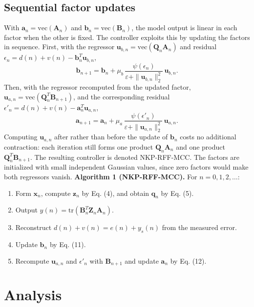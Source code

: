 \documentclass[preprint,12pt]{elsarticle}
\begin{document}
\subsection{Sequential factor updates}
With $\mathbf{a}_n = \mathrm{vec}(\mathbf{A}_n)$ and $\mathbf{b}_n = \mathrm{vec}(\mathbf{B}_n)$, the model output is linear in each factor when the other is fixed. The controller exploits this by updating the factors in sequence. First, with the regressor $\mathbf{u}_{b,n} = \mathrm{vec}(\mathbf{Q}_n \mathbf{A}_n)$ and residual $\epsilon_n = d(n) + v(n) - \mathbf{b}_n^T \mathbf{u}_{b,n}$,
\begin{equation}
\mathbf{b}_{n+1} = \mathbf{b}_n + \mu_b\, \frac{\psi(\epsilon_n)}{\varepsilon + \|\mathbf{u}_{b,n}\|_2^2}\, \mathbf{u}_{b,n}. \tag{11}
\end{equation}
Then, with the regressor recomputed from the updated factor, $\mathbf{u}_{a,n} = \mathrm{vec}(\mathbf{Q}_n^T \mathbf{B}_{n+1})$, and the corresponding residual $\epsilon'_n = d(n) + v(n) - \mathbf{a}_n^T \mathbf{u}_{a,n}$,
\begin{equation}
\mathbf{a}_{n+1} = \mathbf{a}_n + \mu_a\, \frac{\psi(\epsilon'_n)}{\varepsilon + \|\mathbf{u}_{a,n}\|_2^2}\, \mathbf{u}_{a,n}. \tag{12}
\end{equation}
Computing $\mathbf{u}_{a,n}$ after rather than before the update of $\mathbf{b}_n$ costs no additional contraction: each iteration still forms one product $\mathbf{Q}_n\mathbf{A}_n$ and one product $\mathbf{Q}_n^T\mathbf{B}_{n+1}$. The resulting controller is denoted NKP-RFF-MCC. The factors are initialized with small independent Gaussian values, since zero factors would make both regressors vanish.
\textbf{Algorithm 1 (NKP-RFF-MCC).} For $n = 0, 1, 2, \ldots$:
\begin{enumerate}
\item Form $\mathbf{x}_n$, compute $\mathbf{z}_n$ by Eq. (4), and obtain $\mathbf{q}_n$ by Eq. (5).
\item Output $y(n) = \mathrm{tr}(\mathbf{B}_n^T \mathbf{Z}_n \mathbf{A}_n)$.
\item Reconstruct $d(n) + v(n) = e(n) + y_s(n)$ from the measured error.
\item Update $\mathbf{b}_n$ by Eq. (11).
\item Recompute $\mathbf{u}_{a,n}$ and $\epsilon'_n$ with $\mathbf{B}_{n+1}$ and update $\mathbf{a}_n$ by Eq. (12).
\end{enumerate}
\section{Analysis}
\end{document}
